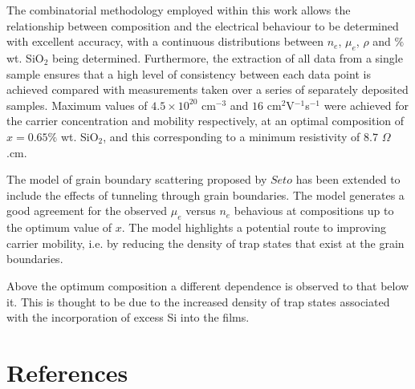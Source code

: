 \documentclass[final,5p,times]{elsarticle}
\begin{document}
The combinatorial methodology employed within this work allows the relationship between composition and the electrical behaviour to be determined with excellent accuracy, with a continuous distributions between $n_e$, $\mu_e$, $\rho$ and $\%$ wt. SiO$_{2}$ being determined. Furthermore, the extraction of all data from a single sample ensures that a high level of consistency between each data point is achieved compared with measurements taken over a series of separately deposited samples. Maximum values of $4.5\times10^{20}$ cm$^{-3}$ and $16$ cm$^{2}$V$^{-1}$s$^{-1}$ were achieved for the carrier concentration and mobility respectively, at an optimal composition of $x =0.65\%$ wt. SiO$_2$, and this corresponding to a minimum resistivity of $8.7$ $\Omega$.cm.

The model of grain boundary scattering proposed by $Seto$ \cite{Seto1975} has been extended to include the effects of tunneling through grain boundaries. The model generates a good agreement for the observed $\mu_e$ versus $n_e$ behavious at compositions up to the optimum value of $x$. The model highlights a potential route to improving carrier mobility, i.e. by reducing the density of trap states that exist at the grain boundaries.

Above the optimum composition a different dependence is observed to that below it. This is thought to be due to the increased density of trap states associated with the incorporation of excess Si into the films.


\section*{References}



\end{document}
